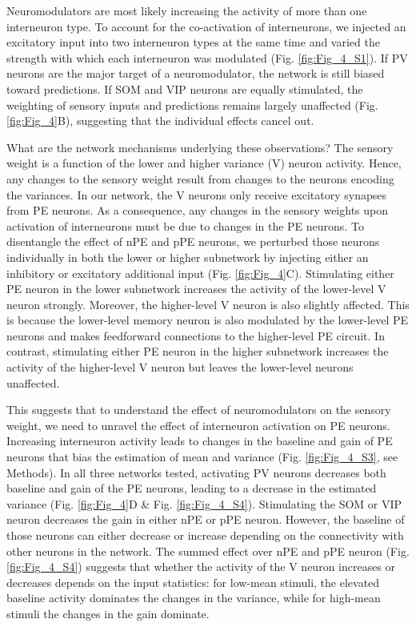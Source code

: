 \documentclass[10pt,a4paper]{article}
\begin{document}
Neuromodulators are most likely increasing the activity of more than one interneuron type. To account for the co-activation of interneurons, we injected an excitatory input into two interneuron types at the same time and varied the strength with which each interneuron was modulated (Fig. \ref{fig:Fig_4_S1}). If PV neurons are the major target of a neuromodulator, the network is still biased toward predictions. If SOM and VIP neurons are equally stimulated, the weighting of sensory inputs and predictions remains largely unaffected (Fig. \ref{fig:Fig_4}B), suggesting that the individual effects cancel out.

What are the network mechanisms underlying these observations? The sensory weight is a function of the lower and higher variance (V) neuron activity. Hence, any changes to the sensory weight result from changes to the neurons encoding the variances. In our network, the V neurons only receive excitatory synapses from PE neurons. As a consequence, any changes in the sensory weights upon activation of interneurons must be due to changes in the PE neurons. To disentangle the effect of nPE and pPE neurons, we perturbed those neurons individually in both the lower or higher subnetwork by injecting either an inhibitory or excitatory additional input (Fig. \ref{fig:Fig_4}C).
Stimulating either PE neuron in the lower subnetwork increases the activity of the lower-level V neuron strongly. Moreover, the higher-level V neuron is also slightly affected. This is because the lower-level memory neuron is also modulated by the lower-level PE neurons and makes feedforward connections to the higher-level PE circuit. In contrast, stimulating either PE neuron in the higher subnetwork increases the activity of the higher-level V neuron but leaves the lower-level neurons unaffected. 

This suggests that to understand the effect of neuromodulators on the sensory weight, we need to unravel the effect of interneuron activation on PE neurons. Increasing interneuron activity leads to changes in the baseline and gain of PE neurons that bias the estimation of mean and variance (Fig. \ref{fig:Fig_4_S3}, see Methods). In all three networks tested, activating PV neurons decreases both baseline and gain of the PE neurons, leading to a decrease in the estimated variance (Fig. \ref{fig:Fig_4}D \& Fig. \ref{fig:Fig_4_S4}). Stimulating the SOM or VIP neuron decreases the gain in either nPE or pPE neuron. However, the baseline of those neurons can either decrease or increase depending on the connectivity with other neurons in the network. The summed effect over nPE and pPE neuron (Fig. \ref{fig:Fig_4_S4}) suggests that whether the activity of the V neuron increases or decreases depends on the input statistics: for low-mean stimuli, the elevated baseline activity dominates the changes in the variance, while for high-mean stimuli the changes in the gain dominate.
\end{document}
